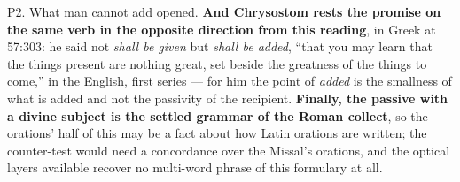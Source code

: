 \begin{proposal}{P2. What man cannot add}
{{opened.} \textbf{And Chrysostom rests the promise on the same verb in the
opposite direction from this reading}, in Greek at 
57:303: he said not \emph{shall be given} but \emph{shall be added}, ``that you
may learn that the things present are nothing great, set beside the greatness of
the things to come,'' in the  English,
first series --- for him the point of
\emph{added} is the smallness of what is added and not the passivity of the
recipient. \textbf{Finally, the passive with a divine subject is the settled
grammar of the Roman collect}, so the orations' half of this may be a fact about
how Latin orations are written; the counter-test would need a concordance over
the Missal's orations, and the optical layers available recover no multi-word
phrase of this formulary at all.}
\end{proposal}

